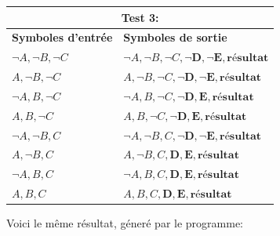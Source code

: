 \documentclass[12pt]{article}
\begin{document}
\begin{tabular}{|p{4cm}|p{6.5cm}|}
  \hline
  \multicolumn{2}{|c|}{\textbf{Test 3:}} \\
  \hline
  \textbf{Symboles d'entrée} & \textbf{Symboles de sortie} \\
  \hline
  $\neg A, \neg B, \neg C$ & $\neg A, \neg B, \neg C, \mathbf{\neg D}, \mathbf{\neg E}, \textbf{résultat}$ \\
  \hline
  $A, \neg B, \neg C$ & $A, \neg B, \neg C, \mathbf{\neg D}, \mathbf{\neg E}, \textbf{résultat}$ \\
  \hline
  $\neg A, B, \neg C$ & $\neg A, B, \neg C, \mathbf{\neg D}, \mathbf{E}, \textbf{résultat}$ \\
  \hline
  $A, B, \neg C$ & $A, B, \neg C, \mathbf{\neg D}, \mathbf{E}, \textbf{résultat}$ \\
  \hline
  $\neg A, \neg B, C$ & $\neg A, \neg B, C, \mathbf{\neg D}, \mathbf{\neg E}, \textbf{résultat}$ \\
  \hline
  $A, \neg B, C$ & $A, \neg B, C, \mathbf{D}, \mathbf{E}, \textbf{résultat}$ \\
  \hline
  $\neg A, B, C$ & $\neg A, B, C, \mathbf{D}, \mathbf{E}, \textbf{résultat}$ \\
  \hline
  $A, B, C$ & $A, B, C, \mathbf{D}, \mathbf{E}, \textbf{résultat}$ \\
  \hline
\end{tabular}

\newpage

Voici le même résultat, géneré par le programme:

\begin{center}
\end{center}
\end{document}
